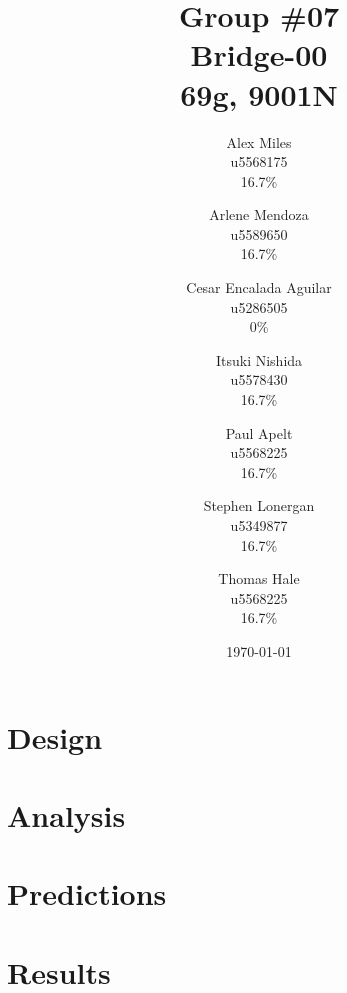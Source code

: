 \documentclass[12pt,titlepage]{article}
\begin{document}
	
	\title{
		Group \#07 \\
		Bridge-00 \\
		69g, 9001N
	}
	\date{\today}
	\author{
		Alex Miles \\ u5568175 \\ 16.7\%
		\and Arlene Mendoza \\ u5589650 \\ 16.7\%
		\and Cesar Encalada Aguilar \\ u5286505 \\ 0\%
		\and Itsuki Nishida \\ u5578430 \\ 16.7\%
		\and Paul Apelt \\ u5568225 \\ 16.7\%
		\and Stephen Lonergan \\ u5349877 \\ 16.7\%
		\and Thomas Hale \\ u5568225 \\ 16.7\%
	}
	\maketitle

	\section{Design}
	\section{Analysis}
	\section{Predictions}
	\section{Results}
	
\end{document}
